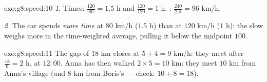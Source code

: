 \begin{solution}{exo:g8:speed:10}
\emph{1.} Times: $\frac{120}{80} = 1.5$ h and $\frac{120}{120} = 1$
h. : $\frac{240}{2.5} = 96$ km/h.

\emph{2.} The car spends \emph{more time} at $80$ km/h ($1.5$ h)
than at $120$ km/h ($1$ h): the slow  weighs more in the
time-weighted average, pulling it below the midpoint $100$.
\end{solution}

\begin{solution}{exo:g8:speed:11}
The gap of $18$ km closes at $5 + 4 = 9$ km/h: they meet after
$\frac{18}{9} = 2$ h, at $12{:}00$. Anna has then walked
$2 \times 5 = 10$ km: they meet $10$ km from Anna's village (and
$8$ km from Boris's --- check: $10 + 8 = 18$).
\end{solution}

